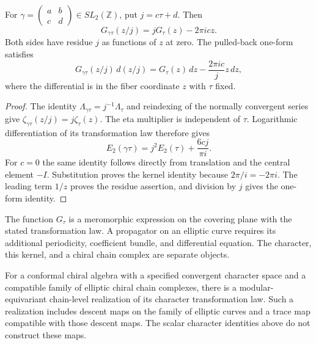 \begin{proposition}
\label{prop:cbc26-elliptic-kernel}
For $\gamma=\left(\begin{smallmatrix}a&b\\c&d\end{smallmatrix}\right)\in SL_2(\mathbb Z)$, put $j=c\tau+d$.
Then
\[
 G_{\gamma\tau}(z/j)=jG_\tau(z)-2\pi i c z.
\]
Both sides have residue $j$ as functions of $z$ at zero.
The pulled-back one-form satisfies
\[
 G_{\gamma\tau}(z/j)\,d(z/j)
 =G_\tau(z)\,dz-\frac{2\pi i c}{j}z\,dz,
\]
where the differential is in the fiber coordinate $z$ with $\tau$ fixed.
\end{proposition}
\begin{proof}
The identity $\Lambda_{\gamma\tau}=j^{-1}\Lambda_\tau$ and reindexing of the normally convergent series give $\zeta_{\gamma\tau}(z/j)=j\zeta_\tau(z)$.
The eta multiplier is independent of $\tau$.
Logarithmic differentiation of its transformation law \cite[Eq.~23.18.5]{DLMF26} therefore gives
\[
 E_2(\gamma\tau)=j^2E_2(\tau)+\frac{6c j}{\pi i}.
\]
For $c=0$ the same identity follows directly from translation and the central element $-I$.
Substitution proves the kernel identity because $2\pi/i=-2\pi i$.
The leading term $1/z$ proves the residue assertion, and division by $j$ gives the one-form identity.
\end{proof}

The function $G_\tau$ is a meromorphic expression on the covering plane with the stated transformation law.
A propagator on an elliptic curve requires its additional periodicity, coefficient bundle, and differential equation.
The character, this kernel, and a chiral chain complex are separate objects.

\begin{conjecture}
\label{conj:modular-anomaly-brst}
For a conformal chiral algebra with a specified convergent character space and a compatible family of elliptic chiral chain complexes, there is a modular-equivariant chain-level realization of its character transformation law.
Such a realization includes descent maps on the family of elliptic curves and a trace map compatible with those descent maps.
The scalar character identities above do not construct these maps.
\end{conjecture}
